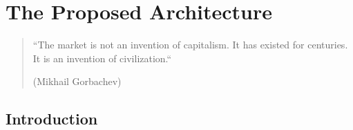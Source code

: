 
\chapter{The Proposed Architecture} \label{chapter:architecture}

\begin{quotation}
``The market is not an invention of capitalism. It has existed for centuries. It is an invention of civilization.``
\begin{flushright}
(Mikhail Gorbachev)
\end{flushright}
\end{quotation}





\section{Introduction}

